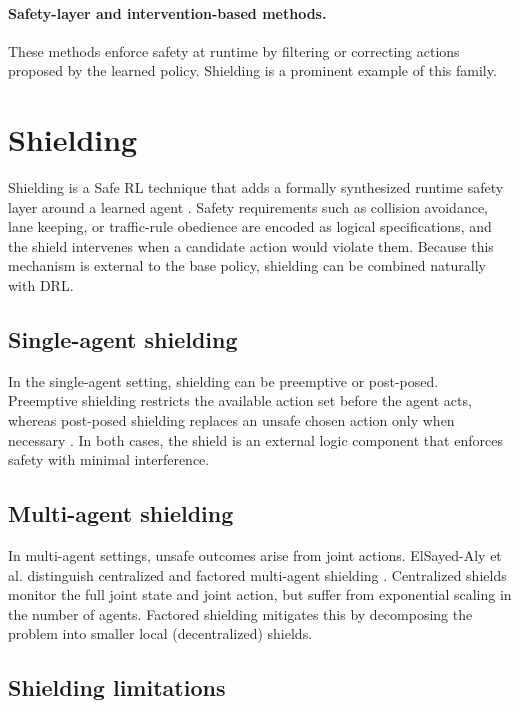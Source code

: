 \paragraph{Safety-layer and intervention-based methods.}
These methods enforce safety at runtime by filtering or correcting actions proposed by the learned policy. Shielding is a prominent example of this family.

\section{Shielding}

Shielding is a Safe RL technique that adds a formally synthesized runtime safety layer around a learned agent \cite{alshiekh2017safereinforcementlearningshielding}. Safety requirements such as collision avoidance, lane keeping, or traffic-rule obedience are encoded as logical specifications, and the shield intervenes when a candidate action would violate them. Because this mechanism is external to the base policy, shielding can be combined naturally with DRL.

\subsection{Single-agent shielding}

In the single-agent setting, shielding can be preemptive or post-posed. Preemptive shielding restricts the available action set before the agent acts, whereas post-posed shielding replaces an unsafe chosen action only when necessary \cite{elsayedaly2021safemultiagentreinforcementlearning}. In both cases, the shield is an external logic component that enforces safety with minimal interference.

\subsection{Multi-agent shielding}

In multi-agent settings, unsafe outcomes arise from joint actions. ElSayed-Aly et al. distinguish centralized and factored multi-agent shielding \cite{elsayedaly2021safemultiagentreinforcementlearning}. Centralized shields monitor the full joint state and joint action, but suffer from exponential scaling in the number of agents. Factored shielding mitigates this by decomposing the problem into smaller local (decentralized) shields.

\subsection{Shielding limitations}

